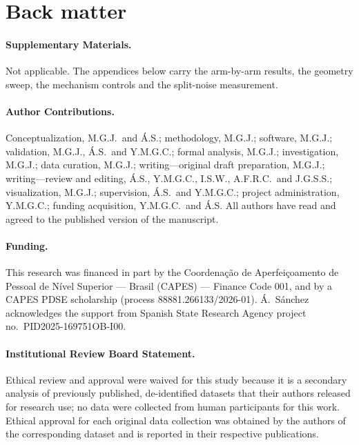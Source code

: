 \section*{Back matter}

\paragraph{Supplementary Materials.} Not applicable. The appendices below carry the arm-by-arm
results, the geometry sweep, the mechanism controls and the split-noise measurement.

\paragraph{Author Contributions.}
Conceptualization, M.G.J.\ and \'A.S.; methodology, M.G.J.; software, M.G.J.; validation, M.G.J.,
\'A.S.\ and Y.M.G.C.; formal analysis, M.G.J.; investigation, M.G.J.; data curation, M.G.J.;
writing---original draft preparation, M.G.J.; writing---review and editing, \'A.S., Y.M.G.C.,
I.S.W., A.F.R.C.\ and J.G.S.S.; visualization, M.G.J.; supervision, \'A.S.\ and Y.M.G.C.; project
administration, Y.M.G.C.; funding acquisition, Y.M.G.C.\ and \'A.S. All authors have read and
agreed to the published version of the manuscript.

\paragraph{Funding.} This research was financed in part by the Coordena\c{c}\~ao de
Aperfei\c{c}oamento de Pessoal de N\'ivel Superior --- Brasil (CAPES) --- Finance Code 001, and by
a CAPES PDSE scholarship (process 88881.266133/2026-01). \'A.~S\'anchez acknowledges the support
from Spanish State Research Agency project no.\ PID2025-169751OB-I00.

\paragraph{Institutional Review Board Statement.} Ethical review and approval were waived for this
study because it is a secondary analysis of previously published, de-identified datasets that their
authors released for research use; no data were collected from human participants for this work.
Ethical approval for each original data collection was obtained by the authors of the corresponding
dataset and is reported in their respective publications.

